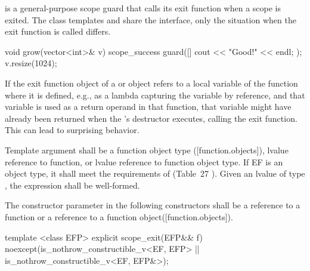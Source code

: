 \documentclass[ebook,11pt,article]{memoir}
\begin{document}
\pnum
{} is a general-purpose scope guard that calls its exit function when a scope is exited. The class templates  and  share the  interface, only the situation when the exit function is called differs.\\
\begin{example}
\begin{codeblock}
void grow(vector<int>& v){
	scope_success guard([]{ cout << "Good!" << endl; });
	v.resize(1024);
}
\end{codeblock}
\end{example}

\pnum
\begin{note}
If the exit function object of a  or  object refers to a local variable of the function where it is defined, e.g., as a lambda capturing the variable by reference, and that variable is used as a return operand in that function, that variable might have already been returned when the 's destructor executes, calling the exit function. This can lead to surprising behavior. 
\end{note}


\pnum
\requires
Template argument  shall be a function object type ([function.objects]), 
lvalue reference to function, or 
lvalue reference to function object type.
If EF is an object type, it shall meet
the requirements of  (Table~27
). 
Given an lvalue  of type , the expression  shall be well-formed.

\pnum
The constructor parameter  in the following constructors shall be a reference to a function or a reference to a function object([function.objects]). 

\newpage
\begin{itemdecl}
template <class EFP>
explicit
scope_exit(EFP&& f) noexcept(is_nothrow_constructible_v<EF, EFP>  
                          || is_nothrow_constructible_v<EF, EFP&>);
\end{itemdecl}
\end{document}
